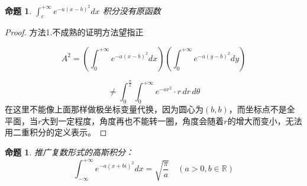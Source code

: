 \documentclass[12pt,a4paper]{article}
\numberwithin{subsection}{section}
\numberwithin{subsubsection}{subsection}
\theoremstyle{plain}
\newtheorem{proposition}[theorem]{命题}
\theoremstyle{definition}
\theoremstyle{remark}
\begin{document}
	\begin{proposition}
		\label{ex:2}
		$	\int_{c}^{+\infty} e^{-a(x-b)^2} dx$
		积分没有原函数
	\end{proposition}
	
	\begin{proof}
		
		
		方法1.不成熟的证明方法望指正
		
		
		
		
		
		\begin{equation*}
			A^2 = \left( \int_{0}^{+\infty} e^{-a(x-b)^2} dx \right) \left( \int_{0}^{+\infty} e^{-a(y-b)^2} dy \right)
		\end{equation*}
		
		\begin{equation*}
			\neq \int_{0}^{\frac{\pi}{2}} \int_{0}^{+\infty} e^{-ar^2} \cdot r \, dr \, d\theta
		\end{equation*}
		在这里不能像上面那样做极坐标变量代换，因为圆心为$(b,b)$，而坐标点不是全平面，当$r$大到一定程度，角度再也不能转一圈，角度会随着$r$的增大而变小，无法用二重积分的定义表示。
		
		
	\end{proof}
	
	
	\begin{proposition}
		\label{ex:2}
		推广复数形式的高斯积分：
		\begin{equation}
			\int_{-\infty}^{+\infty} e^{-a(x+bi)^2} dx = \sqrt{\frac{\pi}{a}} \quad (a>0, b \in \mathbb{R})
		\end{equation}
	\end{proposition}
	
\end{document}
